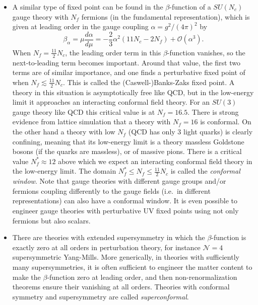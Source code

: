 \documentclass[a4paper,12pt]{article}
\renewcommand{\O}{\mathcal{O}}
\numberwithin{equation}{section}
\begin{document}
\begin{itemize}
\item
A similar type of fixed point can be found in the $\beta$-function of a $SU(N_c)$ gauge theory with $N_f$ fermions (in the fundamental representation), which is given at leading order in the gauge coupling $\alpha = g^2/(4\pi)^2$ by
\begin{equation}
	\beta_\alpha = \mu \frac{d\alpha}{d\mu}
	= -\frac{2}{3} \alpha^2 \left(11 N_c - 2 N_f \right)
	+ \O(\alpha^3).
\end{equation}
When $N_f = \frac{11}{2} N_c$, the leading order term in this $\beta$-function vanishes, so the next-to-leading term becomes important. Around that value, the first two terms are of similar importance, and one finds a perturbative fixed point of when $N_f \lesssim \frac{11}{2} N_c$. This is called the (Caswell-)Banks-Zaks fixed point. A theory in this situation is asymptotically free like QCD, but in the low-energy limit it approaches an interacting conformal field theory.
For an $SU(3)$ gauge theory like QCD this critical value is at $N_f = 16.5$. There is strong evidence from lattice simulation that a theory with $N_f = 16$ is conformal. On the other hand a theory with low $N_f$ (QCD has only 3 light quarks) is clearly confining, meaning that its low-energy limit is a theory massless Goldstone bosons (if the quarks are massless), or of massive pions. There is a critical value $N_f^* \approx 12$ above which we expect an interacting conformal field theory in the low-energy limit. The domain $N_f^* \leq N_f \leq \frac{11}{2} N_c$ is called the \emph{conformal window}. Note that gauge theories with different gauge groups and/or fermions coupling differently to the gauge fields (i.e.~in different representations) can also have a conformal window. It is even possible to engineer gauge theories with perturbative UV fixed points using not only fermions but also scalars.

\item
There are theories with extended supersymmetry in which the $\beta$-function is exactly zero at all orders in perturbation theory, for instance $\mathcal{N} = 4$ supersymmetric Yang-Mills. More generically, in theories with sufficiently many supersymmetries, it is often sufficient to engineer the matter content to make the $\beta$-function zero at leading order, and then non-renormalization theorems ensure their vanishing at all orders. Theories with conformal symmetry and supersymmetry are called \emph{superconformal}.


\end{itemize}
\end{document}
